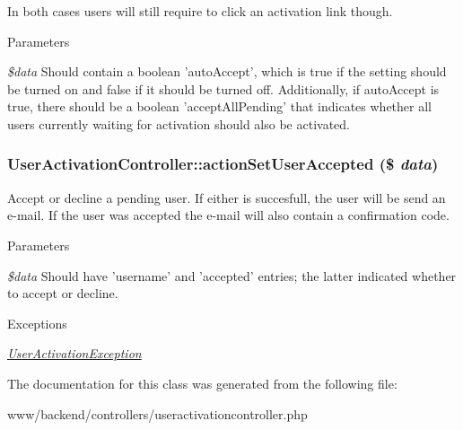 In both cases users will still require to click an activation link though.


\begin{DoxyParams}{Parameters}
\item[{\em \$data}]Should contain a boolean 'autoAccept', which is true if the setting should be turned on and false if it should be turned off. Additionally, if autoAccept is true, there should be a boolean 'acceptAllPending' that indicates whether all users currently waiting for activation should also be activated. \end{DoxyParams}
\hypertarget{classUserActivationController_a6516a31d5f6c0f31f735dd75c5cb956b}{
\subsubsection[{actionSetUserAccepted}]{\setlength{\rightskip}{0pt plus 5cm}UserActivationController::actionSetUserAccepted (\$ {\em data})}}
\label{classUserActivationController_a6516a31d5f6c0f31f735dd75c5cb956b}
Accept or decline a pending user. If either is succesfull, the user will be send an e-\/mail. If the user was accepted the e-\/mail will also contain a confirmation code.


\begin{DoxyParams}{Parameters}
\item[{\em \$data}]Should have 'username' and 'accepted' entries; the latter indicated whether to accept or decline.\end{DoxyParams}

\begin{DoxyExceptions}{Exceptions}
\item[{\em \hyperlink{classUserActivationException}{UserActivationException}}]\end{DoxyExceptions}


The documentation for this class was generated from the following file:\begin{DoxyCompactItemize}
\item 
www/backend/controllers/useractivationcontroller.php\end{DoxyCompactItemize}
